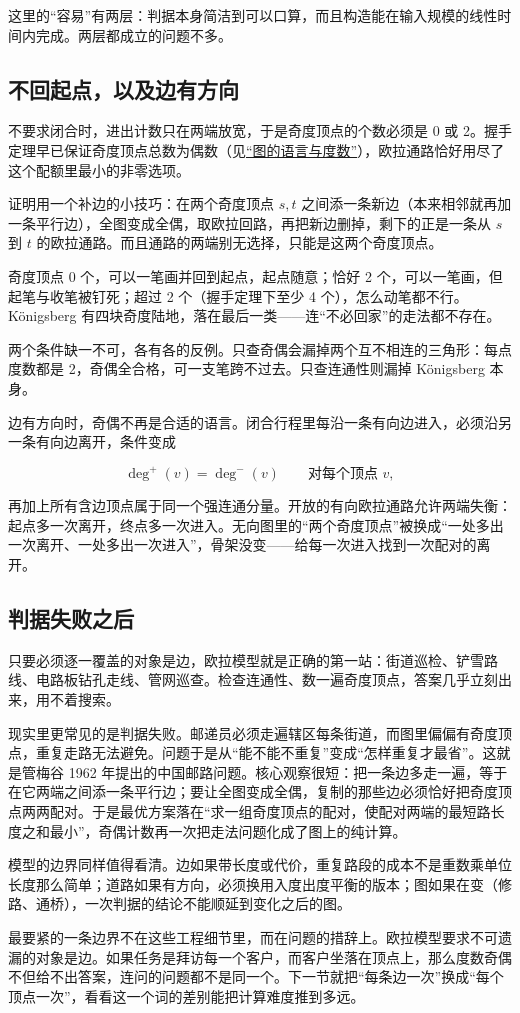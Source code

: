 这里的``容易''有两层：判据本身简洁到可以口算，而且构造能在输入规模的线性时间内完成。两层都成立的问题不多。

\subsection{不回起点，以及边有方向}

不要求闭合时，进出计数只在两端放宽，于是奇度顶点的个数必须是 0 或 2。握手定理早已保证奇度顶点总数为偶数（见\hyperref[sec:04-Discrete-Mathematics/03-Graph-Theory/01]{``图的语言与度数''}），欧拉通路恰好用尽了这个配额里最小的非零选项。

证明用一个补边的小技巧：在两个奇度顶点 \(s,t\) 之间添一条新边（本来相邻就再加一条平行边），全图变成全偶，取欧拉回路，再把新边删掉，剩下的正是一条从 \(s\) 到 \(t\) 的欧拉通路。而且通路的两端别无选择，只能是这两个奇度顶点。

奇度顶点 0 个，可以一笔画并回到起点，起点随意；恰好 2 个，可以一笔画，但起笔与收笔被钉死；超过 2 个（握手定理下至少 4 个），怎么动笔都不行。Königsberg 有四块奇度陆地，落在最后一类——连``不必回家''的走法都不存在。

两个条件缺一不可，各有各的反例。只查奇偶会漏掉两个互不相连的三角形：每点度数都是 2，奇偶全合格，可一支笔跨不过去。只查连通性则漏掉 Königsberg 本身。

边有方向时，奇偶不再是合适的语言。闭合行程里每沿一条有向边进入，必须沿另一条有向边离开，条件变成

\[
\deg^{+}(v)=\deg^{-}(v)
\qquad\text{对每个顶点 }v,
\]

再加上所有含边顶点属于同一个强连通分量。开放的有向欧拉通路允许两端失衡：起点多一次离开，终点多一次进入。无向图里的``两个奇度顶点''被换成``一处多出一次离开、一处多出一次进入''，骨架没变——给每一次进入找到一次配对的离开。

\subsection{判据失败之后}

只要必须逐一覆盖的对象是边，欧拉模型就是正确的第一站：街道巡检、铲雪路线、电路板钻孔走线、管网巡查。检查连通性、数一遍奇度顶点，答案几乎立刻出来，用不着搜索。

现实里更常见的是判据失败。邮递员必须走遍辖区每条街道，而图里偏偏有奇度顶点，重复走路无法避免。问题于是从``能不能不重复''变成``怎样重复才最省''。这就是管梅谷 1962 年提出的中国邮路问题。核心观察很短：把一条边多走一遍，等于在它两端之间添一条平行边；要让全图变成全偶，复制的那些边必须恰好把奇度顶点两两配对。于是最优方案落在``求一组奇度顶点的配对，使配对两端的最短路长度之和最小''，奇偶计数再一次把走法问题化成了图上的纯计算。

模型的边界同样值得看清。边如果带长度或代价，重复路段的成本不是重数乘单位长度那么简单；道路如果有方向，必须换用入度出度平衡的版本；图如果在变（修路、通桥），一次判据的结论不能顺延到变化之后的图。

最要紧的一条边界不在这些工程细节里，而在问题的措辞上。欧拉模型要求不可遗漏的对象是边。如果任务是拜访每一个客户，而客户坐落在顶点上，那么度数奇偶不但给不出答案，连问的问题都不是同一个。下一节就把``每条边一次''换成``每个顶点一次''，看看这一个词的差别能把计算难度推到多远。
